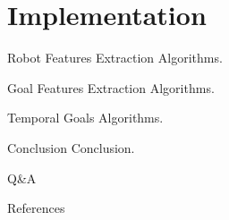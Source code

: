 \documentclass[10pt]{beamer}
\begin{document}
    \section{Implementation}

    \begin{frame}{Robot Features Extraction}
        Algorithms.
    \end{frame}

    \begin{frame}{Goal Features Extraction}
        Algorithms.
    \end{frame}

    \begin{frame}{Temporal Goals}
        Algorithms.
    \end{frame}

    

    \begin{frame}{Conclusion}
        Conclusion.
    \end{frame}

    \begin{frame}[standout]
        Q\&A
    \end{frame}

    \appendix

    \begin{frame}[allowframebreaks]{References}
        
        
    \end{frame}
\end{document}
